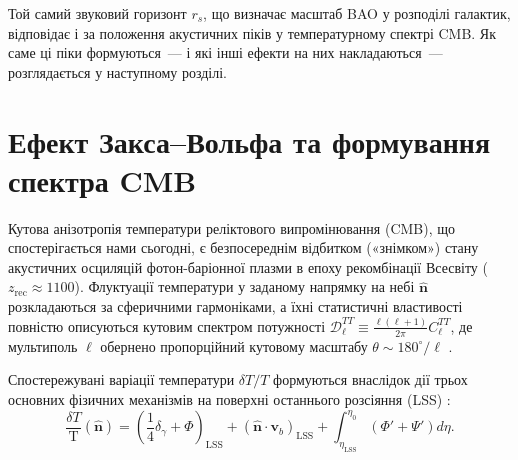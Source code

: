 \documentclass[12pt, a4paper]{article}
\begin{document}
Той самий звуковий горизонт $r_s$, що визначає масштаб
BAO у розподілі галактик, відповідає і за положення
акустичних піків у температурному спектрі CMB. Як саме
ці піки формуються~--- і які інші ефекти на них
накладаються~--- розглядається у наступному розділі.


\section{Ефект Закса--Вольфа та формування спектра CMB}
\label{sec:sachs}

Кутова анізотропія температури реліктового випромінювання (CMB), що спостерігається нами сьогодні, є безпосереднім відбитком («знімком») стану акустичних осциляцій фотон-баріонної плазми в епоху рекомбінації Всесвіту ($z_{\mathrm{rec}} \approx 1100$). Флуктуації температури у заданому напрямку на небі $\hat{\mathbf{n}}$ розкладаються за сферичними гармоніками, а їхні статистичні властивості повністю описуються кутовим спектром потужності $\mathcal{D}_\ell^{TT} \equiv \frac{\ell(\ell+1)}{2\pi}C_\ell^{TT}$, де мультиполь $\ell$ обернено пропорційний кутовому масштабу $\theta \sim 180^\circ / \ell$ \cite{dodelson_2020}.

Спостережувані варіації температури $\delta T / T$ формуються внаслідок дії трьох основних фізичних механізмів на поверхні останнього розсіяння (LSS) \cite{hu_sugiyama_1995}:
\begin{equation}\label{eq:cmb_sources}
  \frac{\delta T}{\text{T}}(\hat{\mathbf{n}}) = \left( \frac{1}{4}\delta_\gamma + \Phi \right)_{\mathrm{LSS}} + \left( \hat{\mathbf{n}} \cdot \mathbf{v}_b \right)_{\mathrm{LSS}} + \int_{\eta_{\mathrm{LSS}}}^{\eta_0} \left( \Phi' + \Psi' \right) d\eta.
\end{equation}
\end{document}

